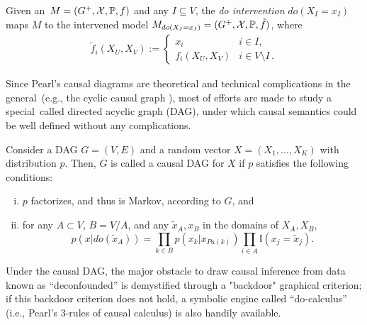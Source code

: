 \begin{Def}[do intervention]
	\label{def:p-intervention}
	Given an \SCM\,$M=(G^+,\mathcal{X},\mathbb{P}, f)$ and any $I \subseteq V$, the \emph{do intervention} $do(X_I=x_I)$ maps $M$ to the intervened model $M_{do(X_I = x_I)} = (G^+,\mathcal{X},\mathbb{P}, \tilde{f})$, where
	$$
	\begin{aligned}
	\tilde f_i(X_U,X_V) := \begin{cases}
	x_i & i \in I, \\
	f_i(X_U,X_V) & i \in V \setminus I \,.
	\end{cases}
	\end{aligned}
	$$
\end{Def}


Since Pearl's causal diagrams are theoretical and technical complications in the general \SCM\,(e.g., 
the cyclic causal graph \cite{Bongers2016}), most of efforts are made to study a special \SCM\,called directed acyclic graph (DAG), under which causal semantics could be well defined without any complications.



\begin{Def}
	Consider a DAG $G=(V, E)$ and a random vector $X = (X_1, ..., X_K)$ with distribution $p$. Then, $G$ is called a causal DAG for $X$ if $p$ satisfies the following conditions:
	\begin{enumerate}[(i)]
		\setlength\itemsep{0em}
		\item $p$ factorizes, and thus is Markov, according to $G$, and
		\item for any $A \subset V$, $B = V/A$,  and any $\tilde{x}_A, x_B$ in the domains of $X_A, X_B$,
		$$
p(x	| do(\tilde{x}_A)) = \prod_{k \in B} p(x_k|x_{Pa(k)})  \prod_{i \in A} \mathbb{I}(x_j = \tilde{x}_j).
		$$
	\end{enumerate}
\end{Def}

Under the causal DAG,  
the major obstacle to draw causal inference from data known as ``deconfounded'' is demystified through a "backdoor" graphical criterion; if 
this backdoor criterion does not hold, a symbolic engine called ``do-calculus'' (i.e., Pearl's 3-rules of causal calculus)  is also handily available.





